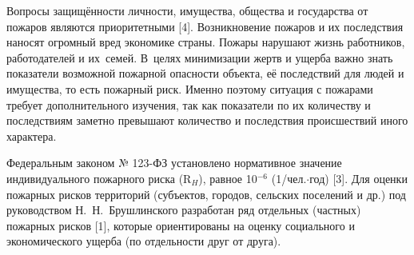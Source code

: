 



\makeProcTitleII
{}

Вопросы защищённости личности, имущества, общества и государства от пожаров являются приоритетными [4]. Возникновение пожаров и их последствия наносят огромный вред экономике страны. Пожары нарушают жизнь работников, работодателей и их семей. В~целях минимизации жертв и ущерба важно знать показатели возможной пожарной опасности объекта, её последствий для людей и имущества, то есть пожарный риск. Именно поэтому ситуация с пожарами требует дополнительного изучения, так как показатели по их количеству и последствиям заметно превышают количество и последствия происшествий иного характера.

Федеральным законом № 123-ФЗ установлено нормативное значение индивидуального пожарного риска (R$_H$), равное 10$^{-6}$ (1/чел.$\cdot$год) [3]. Для оценки пожарных рисков территорий (субъектов, городов, сельских поселений и др.) под руководством Н.~Н.~Брушлинского разработан ряд отдельных (частных) пожарных рисков [1], которые ориентированы на оценку социального и экономического ущерба (по отдельности друг от друга).

